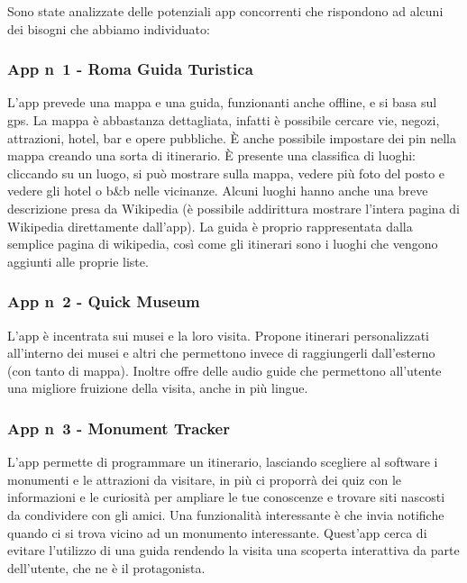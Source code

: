 Sono state analizzate delle potenziali app concorrenti che rispondono ad alcuni dei bisogni
che abbiamo individuato:

\subsubsection*{App n\degree \ 1 - Roma Guida Turistica}
L'app prevede una mappa e una guida, funzionanti anche offline, e si basa sul gps.
La mappa è abbastanza dettagliata, infatti è possibile cercare vie,
negozi, attrazioni, hotel, bar e opere pubbliche.
È anche possibile impostare dei pin nella mappa creando una sorta di itinerario.
È presente una classifica di luoghi: cliccando su un luogo, si può mostrare sulla mappa,
vedere più foto del posto e vedere gli hotel o b\&b nelle vicinanze.
Alcuni luoghi hanno anche una breve descrizione presa da Wikipedia
(è possibile addirittura mostrare l’intera pagina di Wikipedia direttamente dall’app).
La guida è proprio rappresentata dalla semplice pagina di wikipedia, 
così come gli itinerari sono i luoghi che vengono aggiunti alle proprie liste.

\subsubsection*{App n\degree \ 2 - Quick Museum}
L'app è incentrata sui musei e la loro visita. Propone itinerari personalizzati all'interno dei musei e altri che permettono invece di raggiungerli dall'esterno (con tanto di mappa). Inoltre offre delle audio guide che permettono all'utente una migliore fruizione della visita, anche in più lingue.

\subsubsection*{App n\degree \ 3 - Monument Tracker}
L'app permette di programmare un itinerario, lasciando scegliere al software i monumenti e le attrazioni da visitare, in più ci proporrà dei quiz con le informazioni e le curiosità per ampliare le tue conoscenze e trovare siti nascosti da condividere con gli amici. Una funzionalità interessante è che invia notifiche quando ci si trova vicino ad un monumento interessante. Quest'app cerca di evitare l'utilizzo di una guida rendendo la visita una scoperta interattiva da parte dell'utente, che ne è il protagonista.